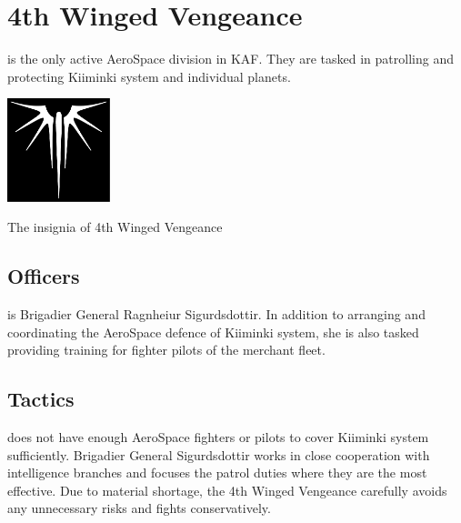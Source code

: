 \documentclass{tufte-book}
\begin{document}
\section{4th Winged Vengeance}

 is the only active AeroSpace division in
KAF. They are tasked in patrolling and protecting Kiiminki system and
individual planets.

\begin{marginfigure}[0\baselineskip]
  \includegraphics[width=3cm]{evil-wings}
  \caption{The insignia of 4th Winged Vengeance}
  \label{fig:winged_vengeance}
\end{marginfigure}

\subsection{Officers}

 is Brigadier General
Ragnhei\dh ur Sigurdsdottir. In addition to arranging and coordinating the
AeroSpace defence of Kiiminki system, she is also tasked providing training
for fighter pilots of the merchant fleet.

\subsection{Tactics}

 does not have enough AeroSpace fighters or
pilots to cover Kiiminki system sufficiently. Brigadier General Sigurdsdottir
works in close cooperation with intelligence branches and focuses the patrol
duties where they are the most effective. Due to material shortage, the 4th
Winged Vengeance carefully avoids any unnecessary risks and fights
conservatively.

\bigskip
{}
\end{document}
